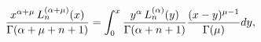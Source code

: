 \[\frac{x^{\alpha+\mu}\mathop{L^{(\alpha+\mu)}_{n}\/}\nolimits\!\left(x\right)}{%
\mathop{\Gamma\/}\nolimits\!\left(\alpha+\mu+n+1\right)}=\int_{0}^{x}\frac{y^{%
\alpha}\mathop{L^{(\alpha)}_{n}\/}\nolimits\!\left(y\right)}{\mathop{\Gamma\/}%
\nolimits\!\left(\alpha+n+1\right)}\frac{(x-y)^{\mu-1}}{\mathop{\Gamma\/}%
\nolimits\!\left(\mu\right)}dy,\]